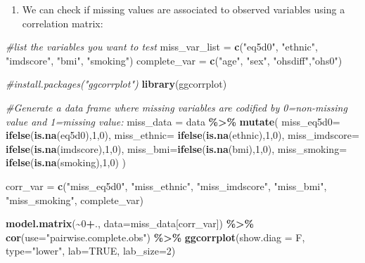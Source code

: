 \documentclass[
]{article}
\newenvironment{Shaded}{\begin{snugshade}}{\end{snugshade}}
\newcommand{\AttributeTok}[1]{\textcolor[rgb]{0.13,0.29,0.53}{#1}}
\newcommand{\CommentTok}[1]{\textcolor[rgb]{0.56,0.35,0.01}{\textit{#1}}}
\newcommand{\ConstantTok}[1]{\textcolor[rgb]{0.56,0.35,0.01}{#1}}
\newcommand{\DecValTok}[1]{\textcolor[rgb]{0.00,0.00,0.81}{#1}}
\newcommand{\FunctionTok}[1]{\textcolor[rgb]{0.13,0.29,0.53}{\textbf{#1}}}
\newcommand{\NormalTok}[1]{#1}
\newcommand{\OtherTok}[1]{\textcolor[rgb]{0.56,0.35,0.01}{#1}}
\newcommand{\SpecialCharTok}[1]{\textcolor[rgb]{0.81,0.36,0.00}{\textbf{#1}}}
\newcommand{\StringTok}[1]{\textcolor[rgb]{0.31,0.60,0.02}{#1}}
\providecommand{\tightlist}{%
  \setlength{\itemsep}{0pt}\setlength{\parskip}{0pt}}
\begin{document}
\begin{enumerate}
\def\labelenumi{\arabic{enumi}.}
\tightlist
\item
  We can check if missing values are associated to observed variables
  using a correlation matrix:
\end{enumerate}

\begin{Shaded}
\begin{Highlighting}[]
\CommentTok{\#list the variables you want to test}
\NormalTok{miss\_var\_list }\OtherTok{=} \FunctionTok{c}\NormalTok{(}\StringTok{"eq5d0"}\NormalTok{, }\StringTok{"ethnic"}\NormalTok{, }\StringTok{"imdscore"}\NormalTok{, }\StringTok{"bmi"}\NormalTok{, }\StringTok{"smoking"}\NormalTok{)}
\NormalTok{complete\_var  }\OtherTok{=} \FunctionTok{c}\NormalTok{(}\StringTok{"age"}\NormalTok{, }\StringTok{"sex"}\NormalTok{, }\StringTok{"ohsdiff"}\NormalTok{,}\StringTok{"ohs0"}\NormalTok{)}

\CommentTok{\#install.packages("ggcorrplot")}
\FunctionTok{library}\NormalTok{(ggcorrplot)}

\CommentTok{\#Generate a data frame where missing variables are codified by 0=non{-}missing value and 1=missing value:}
\NormalTok{miss\_data }\OtherTok{=}\NormalTok{  data }\SpecialCharTok{\%\textgreater{}\%} \FunctionTok{mutate}\NormalTok{(}
  \AttributeTok{miss\_eq5d0=} \FunctionTok{ifelse}\NormalTok{(}\FunctionTok{is.na}\NormalTok{(eq5d0),}\DecValTok{1}\NormalTok{,}\DecValTok{0}\NormalTok{), }
  \AttributeTok{miss\_ethnic=} \FunctionTok{ifelse}\NormalTok{(}\FunctionTok{is.na}\NormalTok{(ethnic),}\DecValTok{1}\NormalTok{,}\DecValTok{0}\NormalTok{), }
  \AttributeTok{miss\_imdscore=} \FunctionTok{ifelse}\NormalTok{(}\FunctionTok{is.na}\NormalTok{(imdscore),}\DecValTok{1}\NormalTok{,}\DecValTok{0}\NormalTok{), }
  \AttributeTok{miss\_bmi=}\FunctionTok{ifelse}\NormalTok{(}\FunctionTok{is.na}\NormalTok{(bmi),}\DecValTok{1}\NormalTok{,}\DecValTok{0}\NormalTok{), }
  \AttributeTok{miss\_smoking=} \FunctionTok{ifelse}\NormalTok{(}\FunctionTok{is.na}\NormalTok{(smoking),}\DecValTok{1}\NormalTok{,}\DecValTok{0}\NormalTok{) )}

\NormalTok{corr\_var }\OtherTok{=} \FunctionTok{c}\NormalTok{(}\StringTok{"miss\_eq5d0"}\NormalTok{, }\StringTok{"miss\_ethnic"}\NormalTok{, }\StringTok{"miss\_imdscore"}\NormalTok{, }\StringTok{"miss\_bmi"}\NormalTok{, }\StringTok{"miss\_smoking"}\NormalTok{, complete\_var)}

\FunctionTok{model.matrix}\NormalTok{(}\SpecialCharTok{\textasciitilde{}}\DecValTok{0}\SpecialCharTok{+}\NormalTok{., }\AttributeTok{data=}\NormalTok{miss\_data[corr\_var]) }\SpecialCharTok{\%\textgreater{}\%} 
  \FunctionTok{cor}\NormalTok{(}\AttributeTok{use=}\StringTok{"pairwise.complete.obs"}\NormalTok{)  }\SpecialCharTok{\%\textgreater{}\%} 
  \FunctionTok{ggcorrplot}\NormalTok{(}\AttributeTok{show.diag =}\NormalTok{ F, }\AttributeTok{type=}\StringTok{"lower"}\NormalTok{, }\AttributeTok{lab=}\ConstantTok{TRUE}\NormalTok{, }\AttributeTok{lab\_size=}\DecValTok{2}\NormalTok{)}
\end{Highlighting}
\end{Shaded}
\end{document}

